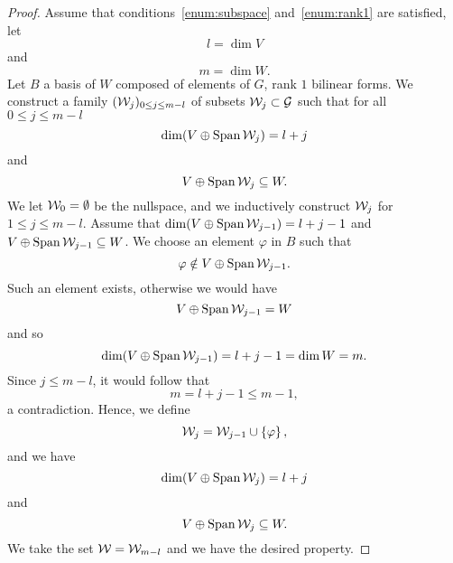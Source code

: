 \begin{proof}
  Assume that conditions~\ref{enum:subspace} and~\ref{enum:rank1} are satisfied,
  let
  \[
    l = \dim V
  \]
  and
  \[
    m = \dim W.
  \]
  Let $B$ a basis of $W$ composed of elements of $G$, \ie rank $1$ bilinear
  forms. We construct a family $(\mathcal{W}_j)_{0\leq j\leq m-l}$ of subsets
  $\mathcal{W}_j\subset\mathcal{G}$ such that for all
  $0\leq j\leq m-l$
  \[
    \dim(V\oplus\operatorname{Span}\mathcal{W}_j) = l+j
  \]
  and
  \[
    V\oplus\operatorname{Span}\mathcal{W}_j \subseteq W.
  \]
  We let $\mathcal{W}_0=\emptyset$ be the nullspace, and we inductively construct $\mathcal{W}_j$
  for $1\leq j\leq m-l$. Assume that  $\dim(V\oplus\operatorname{Span}\mathcal{W}_{j-1}) = l+j-1$ and
  $V\oplus\operatorname{Span}\mathcal{W}_{j-1} \subseteq W$. We choose an element $\varphi$ in $B$ such
  that
  \[
    \varphi\notin V\oplus\operatorname{Span}\mathcal{W}_{j-1}.
  \]
  Such an element exists, otherwise we would have
  \[
    V\oplus\operatorname{Span}\mathcal{W}_{j-1}=W
  \]
  and so 
  \[
    \dim(V\oplus\operatorname{Span}\mathcal{W}_{j-1}) = l+j-1=\dim W = m.
  \]
  Since $j\leq m-l$, it would follow that
  \[
    m = l+j-1\leq m-1,
  \]
  a contradiction. Hence, we define 
  \[
    \mathcal{W}_j = \mathcal{W}_{j-1}\cup\left\{ \varphi \right\},
  \]
  and we have
  \[
    \dim(V\oplus\operatorname{Span}\mathcal{W}_j) = l+j
  \]
  and
  \[
    V\oplus\operatorname{Span}\mathcal{W}_j \subseteq W.
  \]
  We take the set $\mathcal{W} = \mathcal{W}_{m-l}$ and we have the desired property.
\end{proof}
% 
